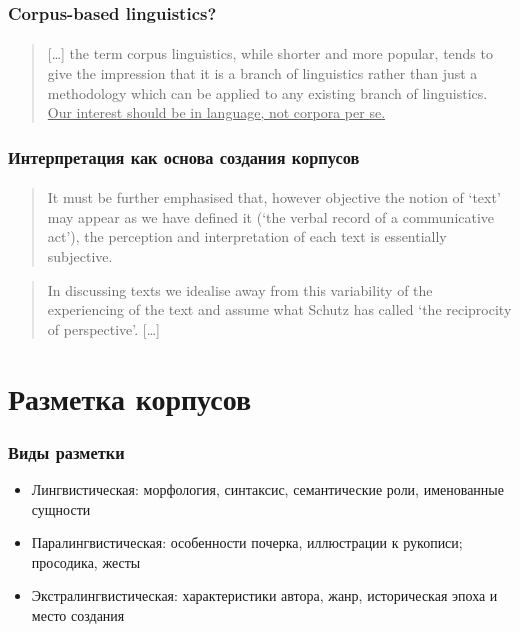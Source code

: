\begin{frame}
    \frametitle{Corpus-based linguistics?}
    \framesubtitle{\autocite{weisser:2016}}

    \begin{quote}
        [\ldots] the term corpus linguistics, while shorter and more popular, tends to give the impression that it is a branch of linguistics rather than just a methodology which can be applied to any existing branch of linguistics. \underline{Our interest should be in language, not corpora per se.}
    \end{quote}
\end{frame}

\begin{frame}
    \frametitle{Интерпретация как основа создания корпусов}
    \framesubtitle{\autocite[6--12]{brown_yule:1983}}

    \begin{quote}
        It must be further emphasised that, however objective the notion of `text' may appear as we have defined it (`the verbal record of a communicative act'), the perception and interpretation of each text is essentially subjective.
    \end{quote}

    \begin{quote}
        In discussing texts we idealise away from this variability of the experiencing of the text and assume what Schutz has called `the reciprocity of perspective'. [\ldots]
    \end{quote}
\end{frame}


\section{Разметка корпусов}

\frame{\tableofcontents[currentsection]}

\begin{frame}
    \frametitle{Виды разметки}

    \begin{itemize}
        \item Лингвистическая: морфология, синтаксис, семантические роли, именованные сущности
        \item Паралингвистическая: особенности почерка, иллюстрации к рукописи; просодика, жесты
        \item Экстралингвистическая: характеристики автора, жанр, историческая эпоха и место создания
    \end{itemize}
\end{frame}

